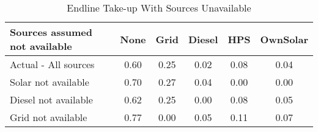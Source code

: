 \begin{table}[htbp]\centering
\caption{Endline Take-up With Sources Unavailable\label {tab1}}
\begin{tabular}{l*{5}{c}}
\toprule
Sources assumed not available    &        None&        Grid&      Diesel&         HPS&    OwnSolar\\
\midrule
Actual - All sources&        0.60&        0.25&        0.02&       \cellcolor{yellow} 0.08&      \cellcolor{yellow}  0.04\\
Solar not available&       0.70&        0.27&        0.04&        0.00&        0.00\\
Diesel not available&        0.62&        0.25&        0.00&        0.08&        0.05\\
Grid not available&        0.77&        0.00&        0.05&       \cellcolor{yellow} 0.11&       \cellcolor{yellow} 0.07\\
\bottomrule
\end{tabular}
\end{table}
